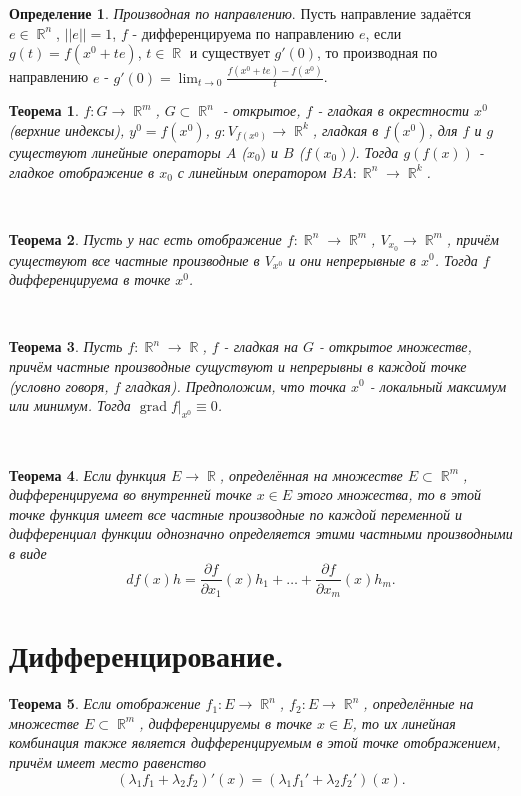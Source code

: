 \documentclass[a4paper,100pt]{article}
\theoremstyle{indented}
\newtheorem{theorem}{Теорема}
\theoremstyle{definition}
\newtheorem{defn}{Определение}
\theoremstyle{remark}
\DeclareMathOperator{\RR}{\mathbb{R}}
\DeclareMathOperator{\grad}{grad}
\begin{document}
\begin{defn}
    \textit{Производная по направлению}. Пусть направление задаётся $e\in\RR^n$, $||e||=1$, $f$ - дифференцируема по направлению $e$, если $g(t)=f(x^0+te)$, $t\in\RR$ и существует $g'(0)$, то производная по направлению $e$ - $g'(0)=\lim_{t\rightarrow 0}\frac{f(x^0+te)-f(x^0)}{t}$. 
\end{defn}

\begin{theorem}
    $f: G\rightarrow \RR^m$, $G\subset \RR^n$ - открытое, $f$ - гладкая в окрестности $x^0$ (верхние индексы), $y^0=f(x^0)$, $g:V_{f(x^0)}\rightarrow \RR^k$, гладкая в $f(x^0)$, для $f$ и $g$ существуют линейные операторы $A$ ($x_0)$ и $B$ ($f(x_0)$). Тогда $g(f(x))$ - гладкое отображение в $x_0$ с линейным оператором $BA:\RR^n\rightarrow \RR^k$. 
\end{theorem} \

\begin{theorem}
    Пусть у нас есть отображение $f:\RR^n\rightarrow \RR^m$, $V_{x_0}\rightarrow \RR^m$, причём существуют все частные производные в $V_{x^0}$ и они непрерывные в $x^0$. Тогда $f$ дифференцируема в точке $x^0$. 
\end{theorem} \ 

\begin{theorem}
    Пусть $f:\RR^n\rightarrow \RR$, $f$ - гладкая на $G$ - открытое множестве, причём частные производные сущуствуют и непрерывны в каждой точке (условно говоря, $f$ гладкая). Предположим, что точка $x^0$ - локальный максимум или минимум. Тогда $\grad f|_{x^0}\equiv 0$.
\end{theorem} \

\begin{theorem}
    Если функция $E\rightarrow \RR$, определённая на множестве $E\subset \RR^m$, дифференцируема во внутренней точке $x\in E$ этого множества, то в этой точке функция имеет все частные производные по каждой переменной и дифференциал функции однозначно определяется этими частными производными в виде
    \[
      df(x)h=\frac{\partial f}{\partial x_1}(x)h_1+\ldots+\frac{\partial f}{\partial x_m}(x)h_m. 
    \]
\end{theorem}

\section{Дифференцирование.}

\begin{theorem}
    Если отображение $f_1: E \rightarrow \RR^n$, $f_2:E \rightarrow \RR^n$, определённые на множестве $E\subset \RR^m$, дифференцируемы в точке $x\in E$, то их линейная комбинация также является дифференцируемым в этой точке отображением, причём имеет место равенство
    \[
        (\lambda_1 f_1 + \lambda_2 f_2)'(x) = (\lambda_1 f_1'+\lambda_2 f_2')(x). 
    \]
\end{theorem}
\end{document}
